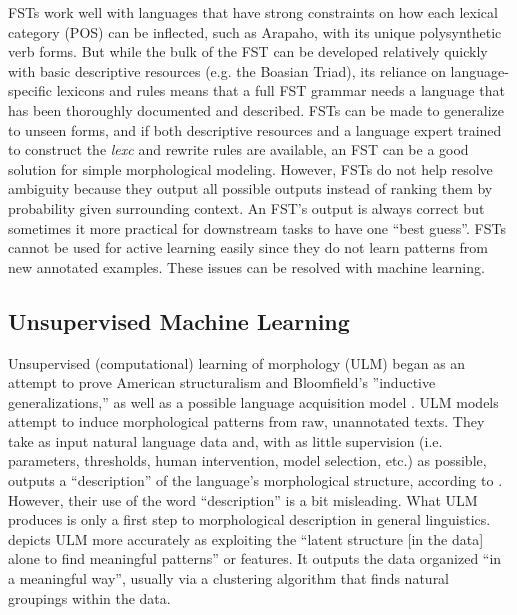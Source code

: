 \documentclass[12pt]{article}
\begin{document}
FSTs work well with languages that have strong constraints on how each lexical category (POS) can be inflected, such as Arapaho, with its unique polysynthetic verb forms. But while the bulk of the FST can be developed relatively quickly with basic descriptive resources (e.g. the Boasian Triad), its reliance on language-specific lexicons and rules means that a full FST grammar needs a language that has been thoroughly documented and described. FSTs can be made to generalize to unseen forms, and if both descriptive resources and a language expert trained to construct the \textit{lexc} and rewrite rules are available, an FST can be a good solution for simple morphological modeling. However, FSTs do not help resolve ambiguity because they output all possible outputs instead of ranking them by probability given surrounding context. An FST's output is always correct but sometimes it more practical for downstream tasks to have one ``best guess''. FSTs cannot be used for active learning easily since they do not learn patterns from new annotated examples. These issues can be resolved with machine learning.

\subsection{Unsupervised Machine Learning}

Unsupervised (computational) learning of morphology (ULM) began as an attempt to prove American structuralism and Bloomfield's ''inductive generalizations,'' as well as a possible language acquisition model \cite{hammarstrom_unsupervised_2011}. ULM models attempt to induce morphological patterns from raw, unannotated texts. They take as input natural language data and, with as little supervision (i.e. parameters, thresholds, human intervention, model selection, etc.) as possible, outputs a ``description'' of the language’s morphological structure, according to . However, their use of the word “description” is a bit misleading. What ULM produces is only a first step to morphological description in general linguistics.  depicts ULM more accurately as exploiting the ``latent structure [in the data] alone to find meaningful patterns'' or features. It outputs the data organized ``in a meaningful way'', usually via a clustering algorithm that finds natural groupings within the data. 
\end{document}

